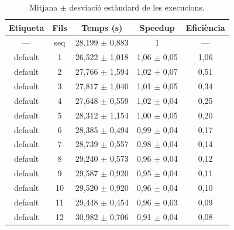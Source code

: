 \begin{table}[H]
\centering
\begin{tabular}{|c|c|c|c|c|}
\hline
\textbf{Etiqueta} & \textbf{Fils} & \textbf{Temps (s)} & \textbf{Speedup} & \textbf{Eficiència} \\ \hline
--- & seq & 28,199 $\pm$ 0,883 & 1 & --- \\ \hline
default & 1 & 26,522 $\pm$ 1,018 & 1,06 $\pm$ 0,05 & 1,06 \\ \hline
default & 2 & 27,766 $\pm$ 1,594 & 1,02 $\pm$ 0,07 & 0,51 \\ \hline
default & 3 & 27,817 $\pm$ 1,040 & 1,01 $\pm$ 0,05 & 0,34 \\ \hline
default & 4 & 27,648 $\pm$ 0,559 & 1,02 $\pm$ 0,04 & 0,25 \\ \hline
default & 5 & 28,312 $\pm$ 1,154 & 1,00 $\pm$ 0,05 & 0,20 \\ \hline
default & 6 & 28,385 $\pm$ 0,494 & 0,99 $\pm$ 0,04 & 0,17 \\ \hline
default & 7 & 28,739 $\pm$ 0,557 & 0,98 $\pm$ 0,04 & 0,14 \\ \hline
default & 8 & 29,240 $\pm$ 0,573 & 0,96 $\pm$ 0,04 & 0,12 \\ \hline
default & 9 & 29,587 $\pm$ 0,920 & 0,95 $\pm$ 0,04 & 0,11 \\ \hline
default & 10 & 29,520 $\pm$ 0,920 & 0,96 $\pm$ 0,04 & 0,10 \\ \hline
default & 11 & 29,448 $\pm$ 0,454 & 0,96 $\pm$ 0,03 & 0,09 \\ \hline
default & 12 & 30,982 $\pm$ 0,706 & 0,91 $\pm$ 0,04 & 0,08 \\ \hline
\end{tabular}
\caption{Mitjana $\pm$ desviació estàndard de les execucions.}
\label{tab:resultats}
\end{table}
